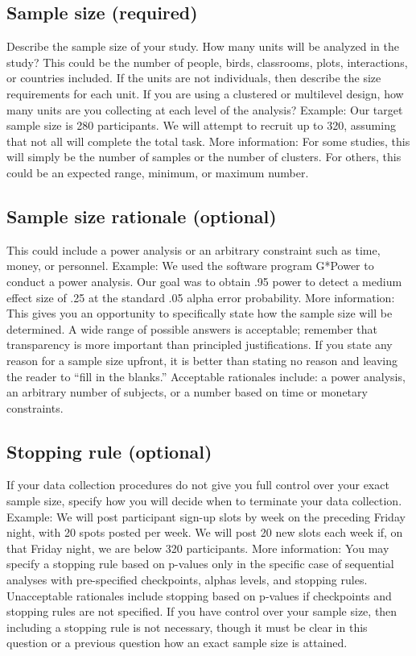 \documentclass[
10pt, %
a4paper, %
oneside, %
headinclude,footinclude, %
BCOR5mm, %
]{scrartcl}
\begin{document}
\subsection{Sample size (required)}
Describe the sample size of your study. How many units will be analyzed in the study? This could be the number of people, birds, classrooms, plots, interactions, or countries included. If the units are not individuals, then describe the size requirements for each unit. If you are using a clustered or multilevel design, how many units are you collecting at each level of the analysis?
Example: Our target sample size is 280 participants. We will attempt to recruit up to 320, assuming that not all will complete the total task. 
More information: For some studies, this will simply be the number of samples or the number of clusters. For others, this could be an expected range, minimum, or maximum number.

\subsection{Sample size rationale (optional)}
This could include a power analysis or an arbitrary constraint such as time, money, or personnel.
Example: We used the software program G*Power to conduct a power analysis. Our goal was to obtain .95 power to detect a medium effect size of .25 at the standard .05 alpha error probability. 
More information: This gives you an opportunity to specifically state how the sample size will be determined. A wide range of possible answers is acceptable; remember that transparency is more important than principled justifications. If you state any reason for a sample size upfront, it is better than stating no reason and leaving the reader to “fill in the blanks.” Acceptable rationales include: a power analysis, an arbitrary number of subjects, or a number based on time or monetary constraints.


\subsection{Stopping rule (optional)}
If your data collection procedures do not give you full control over your exact sample size, specify how you will decide when to terminate your data collection. 
Example: We will post participant sign-up slots by week on the preceding Friday night, with 20 spots posted per week. We will post 20 new slots each week if, on that Friday night, we are below 320 participants. 
More information: You may specify a stopping rule based on p-values only in the specific case of sequential analyses with pre-specified checkpoints, alphas levels, and stopping rules. Unacceptable rationales include stopping based on p-values if checkpoints and stopping rules are not specified. If you have control over your sample size, then including a stopping rule is not necessary, though it must be clear in this question or a previous question how an exact sample size is attained.
\end{document}
